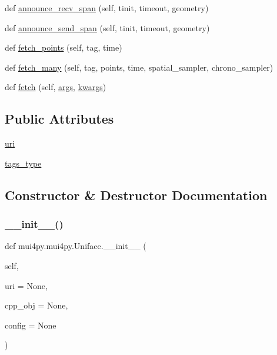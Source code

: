 \begin{DoxyCompactItemize}
def \hyperlink{classmui4py_1_1mui4py_1_1_uniface_a6ec241cc13c75a65da2044f106269c60}{announce\+\_\+recv\+\_\+span} (self, tinit, timeout, geometry)
\item 
def \hyperlink{classmui4py_1_1mui4py_1_1_uniface_ace88ca525a6ad70b379b62782e222d51}{announce\+\_\+send\+\_\+span} (self, tinit, timeout, geometry)
\item 
def \hyperlink{classmui4py_1_1mui4py_1_1_uniface_ab37ab13940afe06c3697a8bc482f1f7c}{fetch\+\_\+points} (self, tag, time)
\item 
def \hyperlink{classmui4py_1_1mui4py_1_1_uniface_af94c5e538216c639214f505621240a22}{fetch\+\_\+many} (self, tag, points, time, spatial\+\_\+sampler, chrono\+\_\+sampler)
\item 
def \hyperlink{classmui4py_1_1mui4py_1_1_uniface_a468f1f8e021f2a61ab96d0d5133a4254}{fetch} (self, \hyperlink{classmui4py_1_1common_1_1_cpp_class_a29797823c6e21f22bba24ee7d35ef31d}{args}, \hyperlink{classmui4py_1_1common_1_1_cpp_class_af43879f06f07b1abf0d08e30c5ead46f}{kwargs})
\end{DoxyCompactItemize}
\subsection*{Public Attributes}
\begin{DoxyCompactItemize}
\item 
\hyperlink{classmui4py_1_1mui4py_1_1_uniface_a0966f7e27032d2f5df4f308e5ede03f3}{uri}
\item 
\hyperlink{classmui4py_1_1mui4py_1_1_uniface_a3b78f041c38df65fd3516391398b2626}{tags\+\_\+type}
\end{DoxyCompactItemize}


\subsection{Constructor \& Destructor Documentation}
\mbox{\label{classmui4py_1_1mui4py_1_1_uniface_a184ceb4f09c11cc67d57795b10cc42d1}} 
\subsubsection{\texorpdfstring{\+\_\+\+\_\+init\+\_\+\+\_\+()}{\_\_init\_\_()}}
{\footnotesize\ttfamily def mui4py.\+mui4py.\+Uniface.\+\_\+\+\_\+init\+\_\+\+\_\+ (\begin{DoxyParamCaption}\item[{}]{self,  }\item[{}]{uri = {\ttfamily None},  }\item[{}]{cpp\+\_\+obj = {\ttfamily None},  }\item[{}]{config = {\ttfamily None} }\end{DoxyParamCaption})}



